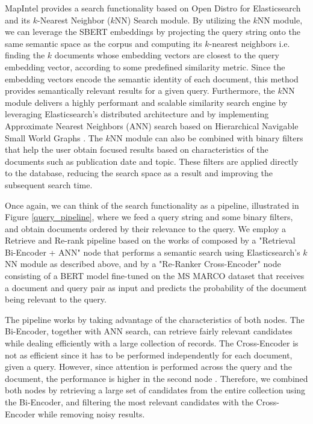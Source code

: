 \documentclass[a4paper]{article}
\begin{document}
MapIntel provides a search functionality based on Open Distro for Elasticsearch and its $k$-Nearest Neighbor ($k$NN) Search module. By utilizing the $k$NN module, we can leverage the SBERT embeddings by projecting the query string onto the same semantic space as the corpus and computing its $k$-nearest neighbors i.e. finding the $k$ documents whose embedding vectors are closest to the query embedding vector, according to some predefined similarity metric. Since the embedding vectors encode the semantic identity of each document, this method provides semantically relevant results for a given query. Furthermore, the $k$NN module delivers a highly performant and scalable similarity search engine by leveraging Elasticsearch’s distributed architecture and by implementing Approximate Nearest Neighbors (ANN) search based on Hierarchical Navigable Small World Graphs \citep{malkov2018}. The $k$NN module can also be combined with binary filters that help the user obtain focused results based on characteristics of the documents such as publication date and topic. These filters are applied directly to the database, reducing the search space as a result and improving the subsequent search time.

Once again, we can think of the search functionality as a pipeline, illustrated in Figure \ref{query_pipeline}, where we feed a query string and some binary filters, and obtain documents ordered by their relevance to the query. We employ a Retrieve and Re-rank pipeline based on the works of \citet{nogueira2020a, kratzwald2019} composed by a "Retrieval Bi-Encoder + ANN" node that performs a semantic search using Elasticsearch’s $k$NN module as described above, and by a "Re-Ranker Cross-Encoder" node consisting of a BERT model fine-tuned on the MS MARCO dataset that receives a document and query pair as input and predicts the probability of the document being relevant to the query.

The pipeline works by taking advantage of the characteristics of both nodes. The Bi-Encoder, together with ANN search, can retrieve fairly relevant candidates while dealing efficiently with a large collection of records. The Cross-Encoder is not as efficient since it has to be performed independently for each document, given a query. However, since attention is performed across the query and the document, the performance is higher in the second node \citep{humeau2019}. Therefore, we combined both nodes by retrieving a large set of candidates from the entire collection using the Bi-Encoder, and filtering the most relevant candidates with the Cross-Encoder while removing noisy results.
\end{document}
